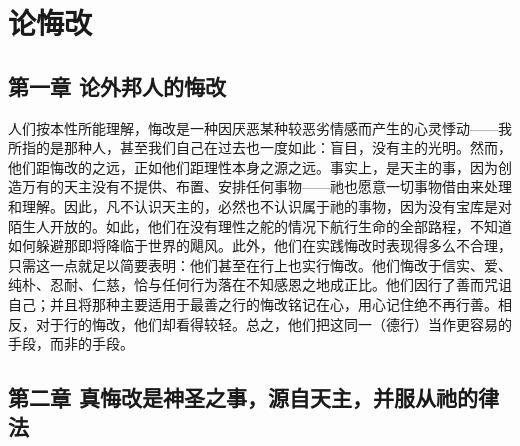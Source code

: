 
\chapter{论悔改}



\section{第一章 论外邦人的悔改}

人们按本性所能理解，悔改是一种因厌恶某种较恶劣情感而产生的心灵悸动——我所指的是那种人，甚至我们自己在过去也一度如此：盲目，没有主的光明。然而，他们距悔改的之远，正如他们距理性本身之源之远。事实上，是天主的事，因为创造万有的天主没有不提供、布置、安排任何事物——祂也愿意一切事物借由来处理和理解。因此，凡不认识天主的，必然也不认识属于祂的事物，因为没有宝库是对陌生人开放的。如此，他们在没有理性之舵的情况下航行生命的全部路程，不知道如何躲避那即将降临于世界的飓风。此外，他们在实践悔改时表现得多么不合理，只需这一点就足以简要表明：他们甚至在行上也实行悔改。他们悔改于信实、爱、纯朴、忍耐、仁慈，恰与任何行为落在不知感恩之地成正比。他们因行了善而咒诅自己；并且将那种主要适用于最善之行的悔改铭记在心，用心记住绝不再行善。相反，对于行的悔改，他们却看得较轻。总之，他们把这同一（德行）当作更容易的手段，而非的手段。\par


\section{第二章 真悔改是神圣之事，源自天主，并服从祂的律法}

